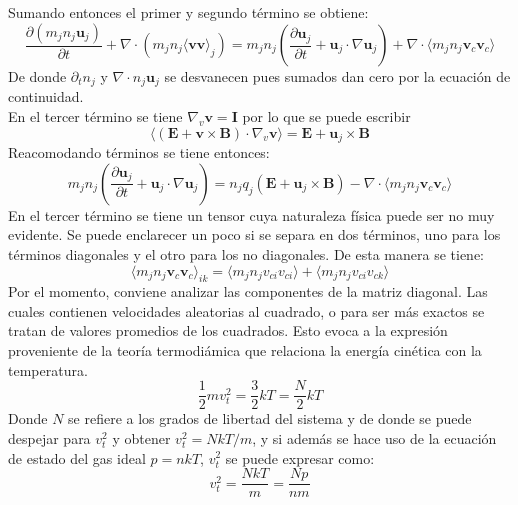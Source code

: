 \documentclass[../tesis_main_file.tex]{subfiles}
\begin{document}
Sumando entonces el primer y segundo término se obtiene:
\begin{equation}
\frac{\partial (m_jn_j\textbf{u}_j)}{\partial t}+\nabla \cdot (m_jn_j\langle \textbf{v}\textbf{v} \rangle_j)=m_jn_j \left( \frac{\partial \textbf{u}_j}{\partial t}+\textbf{u}_j\cdot \nabla \textbf{u}_j \right)+ \nabla \cdot \langle m_jn_j \textbf{v}_c \textbf{v}_c \rangle
\end{equation}
De donde $\partial_t n_j$ y $\nabla \cdot n_j \textbf{u}_j$ se desvanecen pues sumados dan cero por la ecuación de continuidad.\\
En el tercer término se tiene $\nabla _v \textbf{v}=\textbf{I}$ por lo que se puede escribir
\begin{equation}
\langle (\textbf{E}+\textbf{v}\times \textbf{B})\cdot \nabla_v\textbf{v}\rangle = \textbf{E}+\textbf{u}_j\times \textbf{B}
\end{equation}
Reacomodando términos se tiene entonces:
\begin{equation}
\label{eq:momento_fluidos}
m_jn_j \left( \frac{\partial \textbf{u}_j}{\partial t}+\textbf{u}_j\cdot \nabla \textbf{u}_j \right)= n_jq_j(\textbf{E}+\textbf{u}_j\times \textbf{B})- \nabla \cdot \langle m_jn_j \textbf{v}_c \textbf{v}_c \rangle
\end{equation}
En el tercer término se tiene un tensor cuya naturaleza física puede ser no muy evidente. Se puede enclarecer un poco si se separa en dos términos, uno para los términos diagonales y el otro para los no diagonales. De esta manera se tiene:
\begin{equation}
\langle m_j n_j \textbf{v}_c \textbf{v}_c \rangle _{ik}=\langle m_j n_jv_{ci}v_{ci}\rangle+ \langle m_j n_jv_{ci}v_{ck}\rangle
\end{equation}
Por el momento, conviene analizar las componentes de la matriz diagonal. Las cuales contienen velocidades aleatorias al cuadrado, o para ser más exactos se tratan de valores promedios de los cuadrados. Esto evoca a la expresión proveniente de la teoría termodiámica que relaciona la energía cinética con la temperatura.
\begin{equation}
\frac{1}{2}mv_t^2 =\frac{3}{2}kT=\frac{N}{2}kT
\end{equation}
Donde $N$ se refiere a los grados de libertad del sistema y de donde se puede despejar para $v_t^2$ y obtener $v_t^2=NkT/m$, y si además se hace uso de la ecuación de estado del gas ideal $p=nkT$, $v^2_t$ se puede expresar como:
\begin{equation}
v_t^2=\frac{NkT}{m}=\frac{Np}{nm}
\end{equation}
\end{document}
